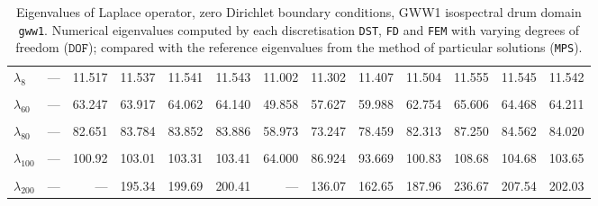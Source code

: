 \begin{table}[htbp]
{{\begin{tabular}{lrrrrrrrrrrrr}
    $\lambda_{8}$ & --- & 11.517 & 11.537 & 11.541 & 11.543 & 11.002 & 11.302 & 11.407 & 11.504 & 11.555 & 11.545 & 11.542 \\
    & & & & & & & & & & & & \\
    $\lambda_{60}$ & --- & 63.247 & 63.917 & 64.062 & 64.140 & 49.858 & 57.627 & 59.988 & 62.754 & 65.606 & 64.468 & 64.211 \\
    & & & & & & & & & & & & \\
    $\lambda_{80}$ & --- & 82.651 & 83.784 & 83.852 & 83.886 & 58.973 & 73.247 & 78.459 & 82.313 & 87.250 & 84.562 & 84.020 \\
    & & & & & & & & & & & & \\
    $\lambda_{100}$ & --- & 100.92 & 103.01 & 103.31 & 103.41 & 64.000 & 86.924 & 93.669 & 100.83 & 108.68 & 104.68 & 103.65 \\
    & & & & & & & & & & & & \\
    $\lambda_{200}$ & --- & --- & 195.34 & 199.69 & 200.41 & --- & 136.07 & 162.65 & 187.96 & 236.67 & 207.54 & 202.03 \\
    \bottomrule
  \end{tabular}}}
  \caption{Eigenvalues of Laplace operator, zero Dirichlet boundary conditions, GWW1 isospectral drum domain \texttt{gww1}. Numerical eigenvalues computed by each discretisation \texttt{DST}, \texttt{FD} and \texttt{FEM} with varying degrees of freedom ($\mathtt{DOF}$); compared with the reference eigenvalues from the method of particular solutions (\texttt{MPS}).}
  \label{tab:eigenvalues_head_gww1_transposed_extended}
\end{table}
